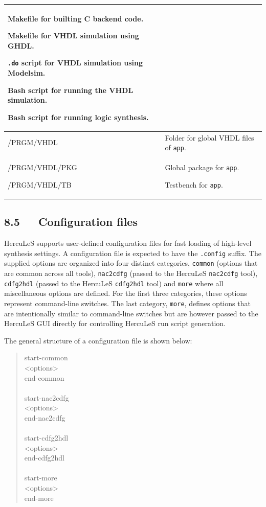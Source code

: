 \documentclass[a4paper]{article}
\newlength{\DUtablewidth} %
\begin{document}
{\begin{longtable*}[c]{|p{0.319\DUtablewidth}|p{0.610\DUtablewidth}|}
Makefile for builting C backend code.

Makefile for VHDL simulation using GHDL.

\texttt{.do} script for VHDL simulation using Modelsim.

Bash script for running the VHDL simulation.

Bash script for running logic synthesis.
 \\
\hline

/PRGM/VHDL
 & 
Folder for global VHDL files of \texttt{app}.
 \\
\hline

/PRGM/VHDL/PKG

/PRGM/VHDL/TB
 & 
Global package for \texttt{app}.

Testbench for \texttt{app}.
 \\
\hline
\end{longtable*}
}

\subsection{8.5~~~Configuration files%
  \label{configuration-files}%
}

HercuLeS supports user-defined configuration files for fast loading of high-level synthesis settings. A configuration file is expected to have the \texttt{.config} suffix. The supplied options are organized into four distinct categories, \texttt{common} (options that are common across all tools), \texttt{nac2cdfg} (passed to the HercuLeS \texttt{nac2cdfg} tool), \texttt{cdfg2hdl} (passed to the HercuLeS \texttt{cdfg2hdl} tool) and \texttt{more} where all miscellaneous options are defined. For the first three categories, these options represent command-line switches. The last category, \texttt{more}, defines options that are intentionally similar to command-line switches but are however passed to the HercuLeS GUI directly for controlling HercuLeS run script generation.

The general structure of a configuration file is shown below:
%
\begin{quote}{\ttfamily \raggedright \noindent
start-common\\
<options>\\
end-common\\
~\\
start-nac2cdfg\\
<options>\\
end-nac2cdfg\\
~\\
start-cdfg2hdl\\
<options>\\
end-cdfg2hdl\\
~\\
start-more\\
<options>\\
end-more
}
\end{quote}
\end{document}
